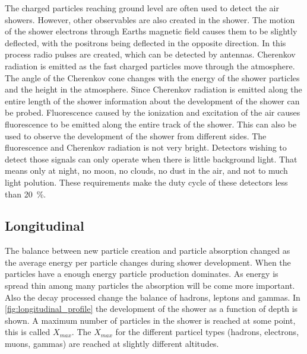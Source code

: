 The charged particles reaching ground level are often used to detect the air showers. However, other observables are also created in the shower. The motion of the shower electrons through Earths magnetic field causes them to be slightly deflected, with the positrons being deflected in the opposite direction. In this process radio pulses are created, which can be detected by antennas. Cherenkov radiation is emitted as the fast charged particles move through the atmosphere. The angle of the Cherenkov cone changes with the energy of the shower particles and the height in the atmosphere. Since Cherenkov radiation is emitted along the entire length of the shower information about the development of the shower can be probed. Fluorescence caused by the ionization and excitation of the air causes fluorescence to be emitted along the entire track of the shower. This can also be used to observe the development of the shower from different sides. The fluorescence and Cherenkov radiation is not very bright. Detectors wishing to detect those signals can only operate when there is little background light. That means only at night, no moon, no clouds, no dust in the air, and not to much light polution. These requirements make the duty cycle of these detectors less than \SI{20}{\percent}.


\subsection{Longitudinal}

The balance between new particle creation and particle absorption changed as the average energy per particle changes during shower development. When the particles have a enough energy particle production dominates. As energy is spread thin among many particles the absorption will be come more important. Also the decay processed change the balance of hadrons, leptons and gammas. In \cref{fig:longitudinal_profile} the development of the shower as a function of depth is shown. A maximum number of particles in the shower is reached at some point, this is called $X_{max}$. The $X_{max}$ for the different particel types (hadrons, electrons, muons, gammas) are reached at slightly different altitudes.

